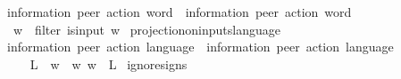 \begin{isabellebody}
\ \ {\isacharcolon}{\kern0pt}{\isacharcolon}{\kern0pt}\ {\isachardoublequoteopen}{\isacharparenleft}{\kern0pt}{\isacharprime}{\kern0pt}information{\isacharcomma}{\kern0pt}\ {\isacharprime}{\kern0pt}peer{\isacharparenright}{\kern0pt}\ action\ word\ {\isasymRightarrow}\ {\isacharparenleft}{\kern0pt}{\isacharprime}{\kern0pt}information{\isacharcomma}{\kern0pt}\ {\isacharprime}{\kern0pt}peer{\isacharparenright}{\kern0pt}\ action\ word{\isachardoublequoteclose}\ \ {\isacharparenleft}{\kern0pt}{\isachardoublequoteopen}{\isacharunderscore}{\kern0pt}{\isasymdown}\isactrlsub {\isacharquery}{\kern0pt}{\isachardoublequoteclose}\ {\isacharbrackleft}{\kern0pt}{}{}{\isacharbrackright}{\kern0pt}\ {}{}{}{\isacharparenright}{\kern0pt}\isanewline
\ \ \isanewline
\ \ \ \ {\isachardoublequoteopen}w{\isasymdown}\isactrlsub {\isacharquery}{\kern0pt}\ {\isasymequiv}\ filter\ is{\isacharunderscore}{\kern0pt}input\ w{\isachardoublequoteclose}\isanewline
\isanewline
{}\isamarkupfalse%
\ projection{\isacharunderscore}{\kern0pt}on{\isacharunderscore}{\kern0pt}inputs{\isacharunderscore}{\kern0pt}language\isanewline
\ \ {\isacharcolon}{\kern0pt}{\isacharcolon}{\kern0pt}\ {\isachardoublequoteopen}{\isacharparenleft}{\kern0pt}{\isacharprime}{\kern0pt}information{\isacharcomma}{\kern0pt}\ {\isacharprime}{\kern0pt}peer{\isacharparenright}{\kern0pt}\ action\ language\ {\isasymRightarrow}\ {\isacharparenleft}{\kern0pt}{\isacharprime}{\kern0pt}information{\isacharcomma}{\kern0pt}\ {\isacharprime}{\kern0pt}peer{\isacharparenright}{\kern0pt}\ action\ language{\isachardoublequoteclose}\isanewline
\ \ {\isacharparenleft}{\kern0pt}{\isachardoublequoteopen}{\isacharunderscore}{\kern0pt}{\isasymdownharpoonright}\isactrlsub {\isacharquery}{\kern0pt}{\isachardoublequoteclose}\ {\isacharbrackleft}{\kern0pt}{}{}{}{\isacharbrackright}{\kern0pt}\ {}{}{}{\isacharparenright}{\kern0pt}\isanewline
\ \ \isanewline
\ \ \ \ {\isachardoublequoteopen}L{\isasymdownharpoonright}\isactrlsub {\isacharquery}{\kern0pt}\ {\isasymequiv}\ {\isacharbraceleft}{\kern0pt}w{\isasymdown}\isactrlsub {\isacharquery}{\kern0pt}\ {\isacharbar}{\kern0pt}\ w{\isachardot}{\kern0pt}\ w\ {\isasymin}\ L{\isacharbraceright}{\kern0pt}{\isachardoublequoteclose}\isanewline
\isanewline
{}\isamarkupfalse%
\ ignore{\isacharunderscore}{\kern0pt}signs\isanewline

\end{isabellebody}
